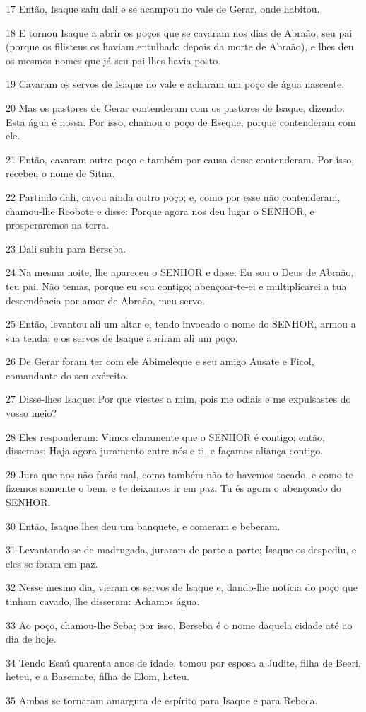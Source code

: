 \par 17 Então, Isaque saiu dali e se acampou no vale de Gerar, onde habitou.
\par 18 E tornou Isaque a abrir os poços que se cavaram nos dias de Abraão, seu pai (porque os filisteus os haviam entulhado depois da morte de Abraão), e lhes deu os mesmos nomes que já seu pai lhes havia posto.
\par 19 Cavaram os servos de Isaque no vale e acharam um poço de água nascente.
\par 20 Mas os pastores de Gerar contenderam com os pastores de Isaque, dizendo: Esta água é nossa. Por isso, chamou o poço de Eseque, porque contenderam com ele.
\par 21 Então, cavaram outro poço e também por causa desse contenderam. Por isso, recebeu o nome de Sitna.
\par 22 Partindo dali, cavou ainda outro poço; e, como por esse não contenderam, chamou-lhe Reobote e disse: Porque agora nos deu lugar o SENHOR, e prosperaremos na terra.
\par 23 Dali subiu para Berseba.
\par 24 Na mesma noite, lhe apareceu o SENHOR e disse: Eu sou o Deus de Abraão, teu pai. Não temas, porque eu sou contigo; abençoar-te-ei e multiplicarei a tua descendência por amor de Abraão, meu servo.
\par 25 Então, levantou ali um altar e, tendo invocado o nome do SENHOR, armou a sua tenda; e os servos de Isaque abriram ali um poço.
\par 26 De Gerar foram ter com ele Abimeleque e seu amigo Ausate e Ficol, comandante do seu exército.
\par 27 Disse-lhes Isaque: Por que viestes a mim, pois me odiais e me expulsastes do vosso meio?
\par 28 Eles responderam: Vimos claramente que o SENHOR é contigo; então, dissemos: Haja agora juramento entre nós e ti, e façamos aliança contigo.
\par 29 Jura que nos não farás mal, como também não te havemos tocado, e como te fizemos somente o bem, e te deixamos ir em paz. Tu és agora o abençoado do SENHOR.
\par 30 Então, Isaque lhes deu um banquete, e comeram e beberam.
\par 31 Levantando-se de madrugada, juraram de parte a parte; Isaque os despediu, e eles se foram em paz.
\par 32 Nesse mesmo dia, vieram os servos de Isaque e, dando-lhe notícia do poço que tinham cavado, lhe disseram: Achamos água.
\par 33 Ao poço, chamou-lhe Seba; por isso, Berseba é o nome daquela cidade até ao dia de hoje.
\par 34 Tendo Esaú quarenta anos de idade, tomou por esposa a Judite, filha de Beeri, heteu, e a Basemate, filha de Elom, heteu.
\par 35 Ambas se tornaram amargura de espírito para Isaque e para Rebeca.

